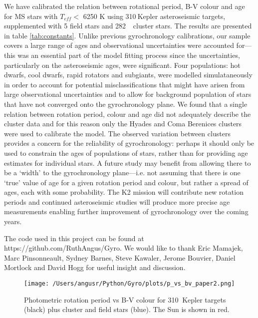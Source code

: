 \documentclass[10pt,preprint]{aastex}
\newcommand{\teff}{$T_{eff}$}
\newcommand{\nastero}{310}
\newcommand{\ncluster}{282~}
\begin{document}
We have calibrated the relation between rotational period, B-V colour and age for MS stars with \teff $<$ 6250 K using \nastero$~$Kepler asteroseismic targets, supplemented with 5 field stars and \ncluster$~$ cluster stars.
The results are presented in table \ref{tab:constants}.
Unlike previous gyrochronology calibrations, our sample covers a large range of ages and observational uncertainties were accounted for---this was an essential part of the model fitting process since the uncertainties, particularly on the asteroseismic ages, were significant.
Four populations: hot dwarfs, cool dwarfs, rapid rotators and subgiants, were modelled simulataneously in order to account for potential misclassifications that might have arisen from large observational uncertainties and to allow for background population of stars that have not converged onto the gyrochronology plane.
We found that a single relation between rotation period, colour and age did not adequately describe the cluster data and for this reason only the Hyades and Coma Berenices clusters were used to calibrate the model.
The observed variation between clusters provides a concern for the reliability of gyrochronology: perhaps it should only be used to constrain the ages of populations of stars, rather than for providing age estimates for individual stars.
A future study may benefit from allowing there to be a `width' to the gyrochronology plane---i.e. not assuming that there is one `true' value of age for a given rotation period and colour, but rather a spread of ages, each with some probability.
The K2 mission will contribute new rotation periods and continued asteroseismic studies will produce more precise age measurements enabling further improvement of gyrochronology over the coming years.

The code used in this project can be found at https://github.com/RuthAngus/Gyro.
We would like to thank Eric Mamajek, Marc Pinsonneault, Sydney Barnes, Steve Kawaler, Jerome Bouvier, Daniel Mortlock and David Hogg for useful insight and discussion.




\begin{figure}[ht]
\begin{center}
\texttt{[image: /Users/angusr/Python/Gyro/plots/p\_vs\_bv\_paper2.png]}
\caption{Photometric rotation period vs B-V colour for \nastero$~$ Kepler targets (black) plus cluster and field stars (blue). The Sun is shown in red.}
\label{fig:3d}
\end{center}
\end{figure}
\end{document}
